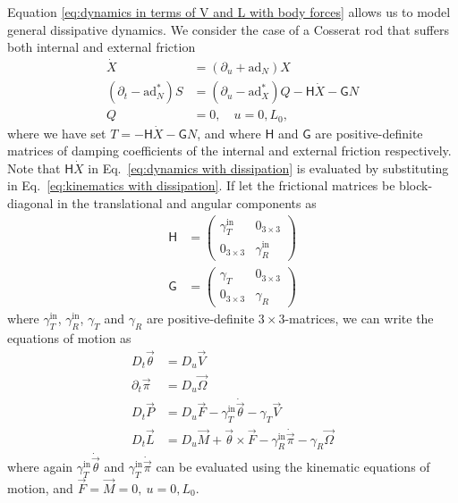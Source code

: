 Equation \ref{eq:dynamics in terms of V and L with body forces} allows us to model general dissipative dynamics. We consider the case of a Cosserat rod that suffers both internal and external friction
\begin{subequations} 
\begin{align}
\dot{X} & = (\partial_u + \text{ad}_N) X \label{eq:kinematics with dissipation} \\
\left(\partial_t - \text{ad}_N^* \right) S & = \left(\partial_u - \text{ad}_X^* \right) Q - \mathsf{H} \dot{X} - \mathsf{G} N \label{eq:dynamics with dissipation} \\
Q & = 0, \quad u = 0, L_0, 
\end{align}
\end{subequations}
where we have set $T = - \mathsf{H} \dot{X} - \mathsf{G} N$, and where $\mathsf{H}$ and $\mathsf{G}$ are positive-definite matrices of damping coefficients of the internal and external friction respectively. Note that $\mathsf{H} \dot{X}$ in Eq.~\ref{eq:dynamics with dissipation} is evaluated by substituting in Eq.~\ref{eq:kinematics with dissipation}. If let the frictional matrices be block-diagonal in the translational and angular components as
\begin{subequations} 
\begin{align}
\mathsf{H} & = \begin{pmatrix}
	\gamma^\text{in}_T & 0_{3 \times 3} \\
	0_{3 \times 3} & \gamma^\text{in}_R
\end{pmatrix} \\ 
\mathsf{G} & = \begin{pmatrix}
	\gamma_T & 0_{3 \times 3} \\
	0_{3 \times 3} & \gamma_R
\end{pmatrix}
\end{align}
\end{subequations}
where $\gamma^\text{in}_T$, $\gamma^\text{in}_R$, $\gamma_T$ and $\gamma_R$ are positive-definite $3 \times 3$-matrices, we can write the equations of motion as
\begin{subequations} 
\begin{align}
D_t \vec{\theta} & = D_u \vec{V} \\
\partial_t \vec{\pi} & = D_u \vec{\Omega} \\
D_t \vec{P} & = D_u \vec{F} - \gamma^\text{in}_T \dot{\vec{\theta}} - \gamma_T \vec{V} \\
D_t \vec{L} & = D_u \vec{M} + \vec{\theta} \times \vec{F}  - \gamma^\text{in}_R \dot{\vec{\pi}} - \gamma_R \vec{\Omega}
\end{align}
\end{subequations}
where again $\gamma^\text{in}_T \dot{\vec{\theta}}$ and $\gamma^\text{in}_T \dot{\vec{\pi}}$ can be evaluated using the kinematic equations of motion, and $\vec{F} = \vec{M} = 0,\ u= 0,L_0$.


